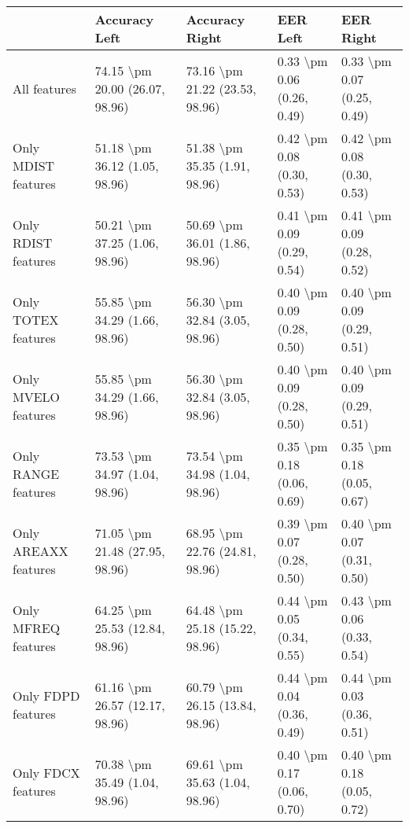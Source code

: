 \begin{tabular}{lllll}
\toprule
{} &                   Accuracy Left &                  Accuracy Right &                    EER Left &                   EER Right \\
\midrule
All features         &  74.15 \textbackslash pm 20.00 (26.07, 98.96) &  73.16 \textbackslash pm 21.22 (23.53, 98.96) &  0.33 \textbackslash pm 0.06 (0.26, 0.49) &  0.33 \textbackslash pm 0.07 (0.25, 0.49) \\
Only MDIST features  &   51.18 \textbackslash pm 36.12 (1.05, 98.96) &   51.38 \textbackslash pm 35.35 (1.91, 98.96) &  0.42 \textbackslash pm 0.08 (0.30, 0.53) &  0.42 \textbackslash pm 0.08 (0.30, 0.53) \\
Only RDIST features  &   50.21 \textbackslash pm 37.25 (1.06, 98.96) &   50.69 \textbackslash pm 36.01 (1.86, 98.96) &  0.41 \textbackslash pm 0.09 (0.29, 0.54) &  0.41 \textbackslash pm 0.09 (0.28, 0.52) \\
Only TOTEX features  &   55.85 \textbackslash pm 34.29 (1.66, 98.96) &   56.30 \textbackslash pm 32.84 (3.05, 98.96) &  0.40 \textbackslash pm 0.09 (0.28, 0.50) &  0.40 \textbackslash pm 0.09 (0.29, 0.51) \\
Only MVELO features  &   55.85 \textbackslash pm 34.29 (1.66, 98.96) &   56.30 \textbackslash pm 32.84 (3.05, 98.96) &  0.40 \textbackslash pm 0.09 (0.28, 0.50) &  0.40 \textbackslash pm 0.09 (0.29, 0.51) \\
Only RANGE features  &   73.53 \textbackslash pm 34.97 (1.04, 98.96) &   73.54 \textbackslash pm 34.98 (1.04, 98.96) &  0.35 \textbackslash pm 0.18 (0.06, 0.69) &  0.35 \textbackslash pm 0.18 (0.05, 0.67) \\
Only AREAXX features &  71.05 \textbackslash pm 21.48 (27.95, 98.96) &  68.95 \textbackslash pm 22.76 (24.81, 98.96) &  0.39 \textbackslash pm 0.07 (0.28, 0.50) &  0.40 \textbackslash pm 0.07 (0.31, 0.50) \\
Only MFREQ features  &  64.25 \textbackslash pm 25.53 (12.84, 98.96) &  64.48 \textbackslash pm 25.18 (15.22, 98.96) &  0.44 \textbackslash pm 0.05 (0.34, 0.55) &  0.43 \textbackslash pm 0.06 (0.33, 0.54) \\
Only FDPD features   &  61.16 \textbackslash pm 26.57 (12.17, 98.96) &  60.79 \textbackslash pm 26.15 (13.84, 98.96) &  0.44 \textbackslash pm 0.04 (0.36, 0.49) &  0.44 \textbackslash pm 0.03 (0.36, 0.51) \\
Only FDCX features   &   70.38 \textbackslash pm 35.49 (1.04, 98.96) &   69.61 \textbackslash pm 35.63 (1.04, 98.96) &  0.40 \textbackslash pm 0.17 (0.06, 0.70) &  0.40 \textbackslash pm 0.18 (0.05, 0.72) \\
\bottomrule
\end{tabular}
